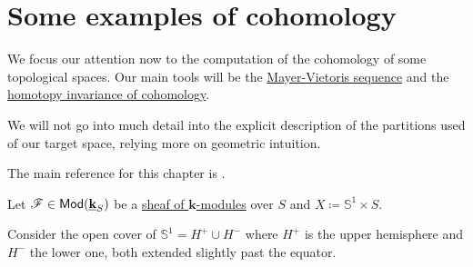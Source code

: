 \documentclass[../../main]{subfiles}
\begin{document}
\chapter{Some examples of cohomology}

We focus our attention now to the computation of the cohomology of some topological spaces.
Our main tools will be the \hyperref[thm:mayer-vietoris-open]{Mayer-Vietoris sequence} and the \hyperref[thm:homotopy-invariance-cohomology]{homotopy invariance of cohomology}.

We will not go into much detail into the explicit description of the partitions used of our target space, relying more on geometric intuition.

The main reference for this chapter is \cite{kashiwaraSheavesManifolds1990}.

\begin{example}[\(\mathbb{S}^{1}\)]\label{ex:cohomology-S1}
  Let \(\mathscr{F} \in \mathsf{Mod}( \underline{\mathbf{k}}_{S} )\) be a \hyperref[def:sheaf]{sheaf of \(\mathbf{k}\)-modules} over \(S\) and \(X \coloneq \mathbb{S}^{1} \times S\).
  
  Consider the open cover of \(\mathbb{S}^{1} = H^{+} \cup H^{-}\) where \(H^{+}\) is the upper hemisphere and \(H^{-}\) the lower one, both extended slightly past the equator.
  \begin{center}
  \end{center}
  

\end{example}
\end{document}
